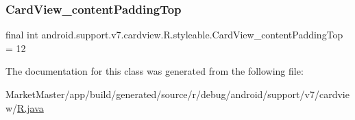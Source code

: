 \subsubsection{\texorpdfstring{Card\+View\+\_\+content\+Padding\+Top}{CardView\_contentPaddingTop}}
{\footnotesize\ttfamily final int android.\+support.\+v7.\+cardview.\+R.\+styleable.\+Card\+View\+\_\+content\+Padding\+Top = 12\hspace{0.3cm}{\ttfamily [static]}}



The documentation for this class was generated from the following file\+:\begin{DoxyCompactItemize}
\item 
Market\+Master/app/build/generated/source/r/debug/android/support/v7/cardview/\mbox{\hyperlink{debug_2android_2support_2v7_2cardview_2R_8java}{R.\+java}}\end{DoxyCompactItemize}
